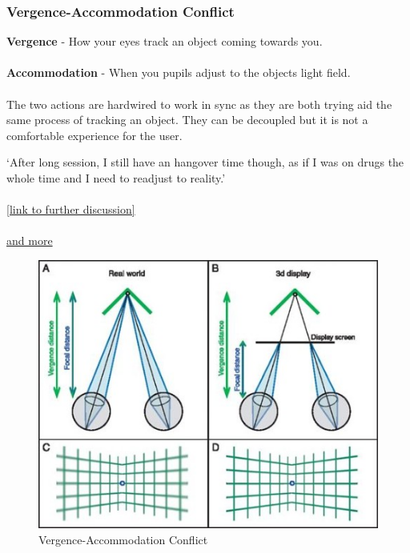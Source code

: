 \begin{frame}
	\frametitle{Vergence-Accommodation Conflict}
	
	\textbf{Vergence} - How your eyes track an object coming towards you. \\~\\

	\textbf{Accommodation} - When you pupils adjust to the objects light field. \\~\\
	
	The two actions are hardwired to work in sync as they are both trying aid the same process of tracking an object. They can be decoupled but it is not a comfortable experience for the user.

\end{frame}

\begin{frame}
	`After long session, I still have an hangover time though, as if I was on drugs the whole time and I need to readjust to reality.' \\~\\
	
	\href{https://www.reddit.com/r/oculus/comments/2clksh/question_for_dk2_owners_how_long_can_you_wear_it/cjgo683}{[link to further discussion]} \\~\\
	\href{https://www.reddit.com/r/oculus/comments/2epu1h/my_body_has_developed_a_fear_of_vr/}{and more}
	
\end{frame}

\begin{frame}
	\begin{figure}
		\includegraphics[scale=.7]{assets/verg} 
		\caption{Vergence-Accommodation Conflict}
	\end{figure}

\end{frame}

